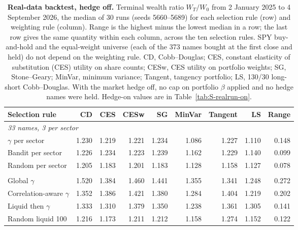 \begin{table}[H]
\centering
\small
\setlength{\tabcolsep}{4pt}
\caption{\textbf{Real-data backtest, hedge off.} Terminal wealth ratio $W_T/W_0$ from 2 January 2025 to 4 September 2026, the median
of 30 runs (seeds 5660--5689) for each selection rule (row) and weighting rule (column). Range is the highest minus
the lowest median in a row; the last row gives the same quantity within each column, across the ten selection
rules. SPY buy-and-hold and the equal-weight universe (each of the 373 names bought at the first close and held) do
not depend on the weighting rule. CD, Cobb--Douglas; CES, constant elasticity of substitution (CES) utility on share
counts; CESw, CES utility on portfolio weights; SG, Stone--Geary; MinVar, minimum variance; Tangent, tangency
portfolio; LS, 130/30 long-short Cobb--Douglas. With the market hedge off, no cap on portfolio $\beta$ applied and no
hedge names were held. Hedge-on values are in Table~\ref{tab:S-realrun-on}.}
\label{tab:realrun}
\begin{tabular}{l*{8}{r}}
\toprule
Selection rule & CD & CES & CESw & SG & MinVar & Tangent & LS & Range \\
\midrule
\multicolumn{9}{l}{\emph{33 names, 3 per sector}} \\
$\gamma$ per sector & 1.230 & 1.219 & 1.221 & 1.234 & 1.086 & 1.227 & 1.110 & 0.148 \\
Bandit per sector & 1.226 & 1.234 & 1.223 & 1.239 & 1.162 & 1.229 & 1.140 & 0.099 \\
Random per sector & 1.205 & 1.183 & 1.201 & 1.183 & 1.128 & 1.158 & 1.127 & 0.078 \\
\addlinespace
\multicolumn{9}{l}{\emph{13 names}} \\
Global $\gamma$ & 1.520 & 1.384 & 1.460 & 1.441 & 1.355 & 1.341 & 1.248 & 0.272 \\
Correlation-aware $\gamma$ & 1.352 & 1.386 & 1.421 & 1.380 & 1.284 & 1.404 & 1.219 & 0.202 \\
Liquid then $\gamma$ & 1.333 & 1.310 & 1.379 & 1.350 & 1.238 & 1.361 & 1.305 & 0.141 \\
Random liquid 100 & 1.216 & 1.173 & 1.211 & 1.212 & 1.158 & 1.274 & 1.152 & 0.122 \\

\end{tabular}
\end{table}
